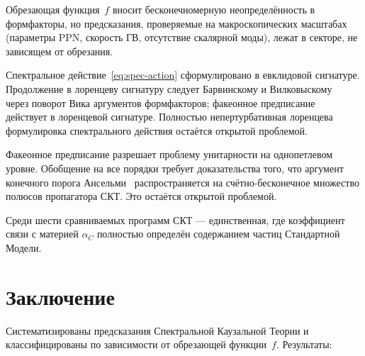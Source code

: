 \documentclass[12pt,a4paper]{article}
\theoremstyle{plain}
\theoremstyle{definition}
\theoremstyle{remark}
\begin{document}
Обрезающая функция~$f$ вносит бесконечномерную неопределённость в
формфакторы, но предсказания, проверяемые на макроскопических
масштабах (параметры PPN, скорость ГВ, отсутствие скалярной моды),
лежат в секторе, не зависящем от обрезания.

Спектральное действие~\eqref{eq:spec-action} сформулировано в
евклидовой сигнатуре. Продолжение в лоренцеву сигнатуру следует
Барвинскому и Вилковыскому~\cite{BV:1990} через поворот Вика
аргументов формфакторов; факеонное
предписание~\cite{Anselmi:2017} действует в лоренцевой сигнатуре.
Полностью непертурбативная лоренцева формулировка спектрального
действия остаётся открытой проблемой.

Факеонное предписание разрешает проблему унитарности на однопетлевом
уровне. Обобщение на все порядки требует доказательства того, что
аргумент конечного порога Ансельми~\cite{Anselmi:2018}
распространяется на счётно-бесконечное множество полюсов пропагатора
СКТ. Это остаётся открытой проблемой.

Среди шести сравниваемых программ СКТ --- единственная, где
коэффициент связи с материей $\alpha_C$ полностью определён
содержанием частиц Стандартной Модели.

\section{Заключение}
\label{sec:conclusions}

Систематизированы предсказания Спектральной Каузальной Теории
и классифицированы по зависимости от обрезающей функции~$f$.
Результаты:
\end{document}
